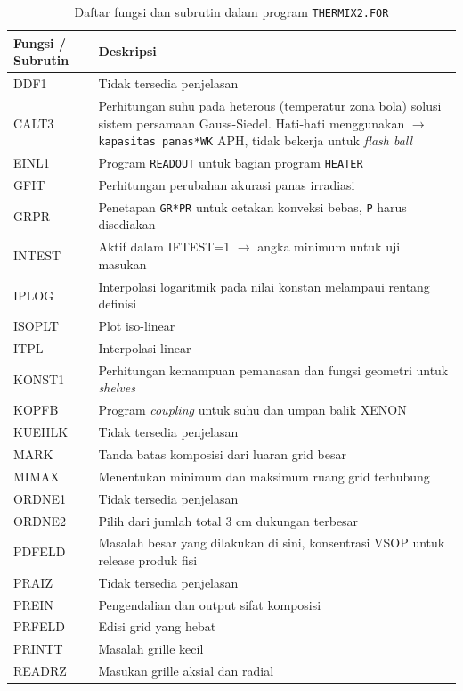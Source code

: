 \documentclass[a4paper,11pt]{report}
\begin{document}
\begin{table}[h!]
  \caption{Daftar fungsi dan subrutin dalam program \texttt{THERMIX2.FOR}}
  \label{tab:the2}

  \begin{center}
    \begin{tabular}{p{3cm}|p{10cm}} \toprule
    Fungsi / Subrutin & Deskripsi\\ \midrule
    DDF1 & Tidak tersedia penjelasan \\
    CALT3 & Perhitungan suhu pada heterous (temperatur zona bola) solusi sistem persamaan Gauss-Siedel. Hati-hati menggunakan $\rightarrow$ \texttt{kapasitas panas*WK} APH, tidak bekerja untuk \textit{flash ball} \\
    EINL1 & Program \texttt{READOUT} untuk bagian program \texttt{HEATER} \\
    GFIT & Perhitungan perubahan akurasi panas irradiasi \\
    GRPR & Penetapan \texttt{GR*PR} untuk cetakan konveksi bebas, \texttt{P} harus disediakan \\
    INTEST & Aktif dalam IFTEST=1 $\rightarrow$ angka minimum untuk uji masukan \\
    IPLOG & Interpolasi logaritmik pada nilai konstan melampaui rentang definisi \\
    ISOPLT & Plot iso-linear \\
    ITPL & Interpolasi linear \\
    KONST1 & Perhitungan kemampuan pemanasan dan fungsi geometri untuk \textit{shelves} \\
    KOPFB & Program \textit{coupling} untuk suhu dan umpan balik XENON \\
    KUEHLK & Tidak tersedia penjelasan\\
    MARK & Tanda batas komposisi dari luaran grid besar \\
    MIMAX & Menentukan minimum dan maksimum ruang grid terhubung \\
    ORDNE1 & Tidak tersedia penjelasan \\
    ORDNE2 & Pilih dari jumlah total 3 cm dukungan terbesar \\
    PDFELD & Masalah besar yang dilakukan di sini, konsentrasi VSOP untuk release produk fisi \\
    PRAIZ & Tidak tersedia penjelasan \\
    PREIN & Pengendalian dan output sifat komposisi \\
    PRFELD & Edisi grid yang hebat \\
    PRINTT & Masalah grille kecil \\
    READRZ & Masukan grille aksial dan radial \\
    \bottomrule
    \end{tabular}
  \end{center}
\end{table}
\end{document}
